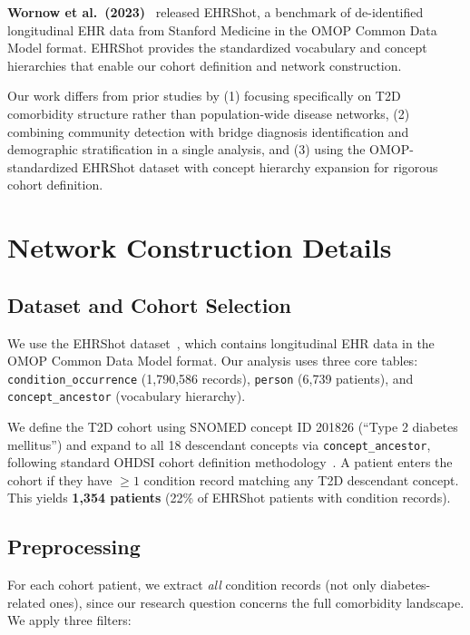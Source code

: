 \documentclass[10pt,twocolumn]{article}
\begin{document}
\textbf{Wornow et al.\ (2023)}~\cite{wornow2023} released EHRShot, a benchmark of de-identified longitudinal EHR data from Stanford Medicine in the OMOP Common Data Model format.
EHRShot provides the standardized vocabulary and concept hierarchies that enable our cohort definition and network construction.

Our work differs from prior studies by (1) focusing specifically on T2D comorbidity structure rather than population-wide disease networks, (2) combining community detection with bridge diagnosis identification and demographic stratification in a single analysis, and (3) using the OMOP-standardized EHRShot dataset with concept hierarchy expansion for rigorous cohort definition.


\section{Network Construction Details}

\subsection{Dataset and Cohort Selection}

We use the EHRShot dataset~\cite{wornow2023}, which contains longitudinal EHR data in the OMOP Common Data Model format.
Our analysis uses three core tables: \texttt{condition\_occurrence} (1,790,586 records), \texttt{person} (6,739 patients), and \texttt{concept\_ancestor} (vocabulary hierarchy).

We define the T2D cohort using SNOMED concept ID 201826 (``Type 2 diabetes mellitus'') and expand to all 18 descendant concepts via \texttt{concept\_ancestor}, following standard OHDSI cohort definition methodology~\cite{barabasi2011}.
A patient enters the cohort if they have $\geq 1$ condition record matching any T2D descendant concept.
This yields \textbf{1,354 patients} (22\% of EHRShot patients with condition records).

\subsection{Preprocessing}

For each cohort patient, we extract \textit{all} condition records (not only diabetes-related ones), since our research question concerns the full comorbidity landscape.
We apply three filters:
\end{document}
